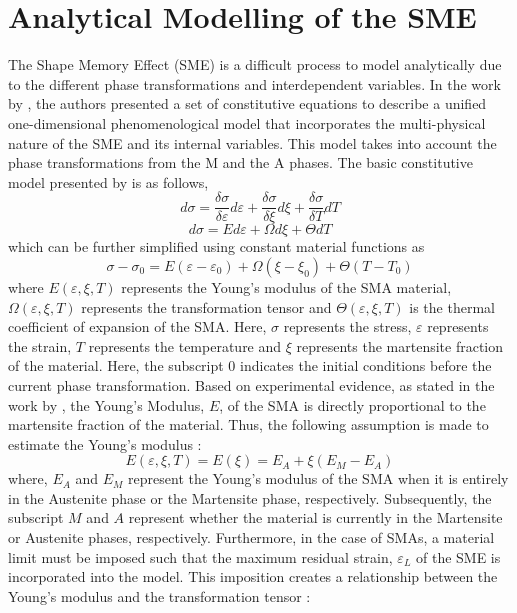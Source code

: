 \section{Analytical Modelling of the SME}
The Shape Memory Effect (SME) is a difficult process to model analytically due to the different phase transformations and interdependent variables. In the work by \cite{liangConstitutiveModelingShape1990a}, the authors presented a set of constitutive equations to describe a unified one-dimensional phenomenological model that incorporates the multi-physical nature of the SME and its internal variables. This model takes into account the phase transformations from the M and the A phases. The basic constitutive model presented by \cite{liangConstitutiveModelingShape1990a} is as follows,
\begin{equation}
  \label{eq:liang_model_1}
  d\sigma = \frac{\delta\sigma}{\delta\varepsilon}d\varepsilon + \frac{\delta\sigma}{\delta\xi}d\xi + \frac{\delta\sigma}{\delta T}dT
\end{equation}
\begin{equation}
  \label{eq:liang_model_2}
  d\sigma = Ed\varepsilon + \Omega d\xi + \Theta dT
\end{equation}
 which can be further simplified using constant material functions as
\begin{equation}
  \label{eq:liang_model_3}
  \sigma-\sigma_0 = E(\varepsilon-\varepsilon_0) + \Omega(\xi-\xi_0) + \Theta(T-T_0)
\end{equation}
where $E(\varepsilon,\xi,T)$ represents the Young's modulus of the SMA material, $\Omega(\varepsilon,\xi,T)$ represents the transformation tensor and $\Theta(\varepsilon,\xi,T)$ is the thermal coefficient of expansion of the SMA. Here, $\sigma$ represents the stress, $\varepsilon$ represents the strain, $T$ represents the temperature and $\xi$ represents the martensite fraction of the material. Here, the subscript 0 indicates the initial conditions before the current phase transformation. Based on experimental evidence, as stated in the work by \cite{liangConstitutiveModelingShape1990a}, the Young's Modulus, $E$, of the SMA is directly proportional to the martensite fraction of the material. Thus, the following assumption is made to estimate the Young's modulus :
\begin{equation}
  \label{eq:youngs-modulus}
  E(\varepsilon,\xi,T) = E(\xi) = E_A + \xi(E_M-E_A)
\end{equation}
where, $E_A$ and $E_M$ represent the Young's modulus of the SMA when it is entirely in the Austenite phase or the Martensite phase, respectively. Subsequently, the subscript $M$ and $A$ represent whether the material is currently in the Martensite or Austenite phases, respectively. Furthermore, in the case of SMAs, a material limit must be imposed such that the maximum residual strain, $\varepsilon_L$ of the SME is incorporated into the model. This imposition creates a relationship between the Young's modulus and the transformation tensor :
